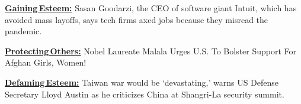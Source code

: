 \begin{tcolorbox}
  \begin{spacing}{0.8}
  \textbf{\ul{\footnotesize Gaining\,Esteem:} }{\fontsize{8}{10}\selectfont
Sasan Goodarzi, the CEO of software giant Intuit, which has avoided mass layoffs, says tech firms axed jobs because they misread the pandemic.}
  \end{spacing} 

  \vspace{-2.5mm}
  \DrawLine

  \begin{spacing}{0.8}
 \textbf{\ul{\footnotesize Protecting\,Others:} }{\fontsize{8}{10}\selectfont 
Nobel Laureate Malala Urges U.S. To Bolster Support For Afghan Girls, Women!}
  \end{spacing}
  
  \vspace{-2.5mm}
  \DrawLine

\begin{spacing}{0.8}
 \textbf{\ul{\footnotesize Defaming\,Esteem:} }{\fontsize{8}{10}\selectfont 
Taiwan war would be ‘devastating,’ warns US Defense Secretary Lloyd Austin as he criticizes China at Shangri-La security summit.}
  \end{spacing}
  \vspace{-1mm}
\end{tcolorbox}

\vspace{-3mm}

